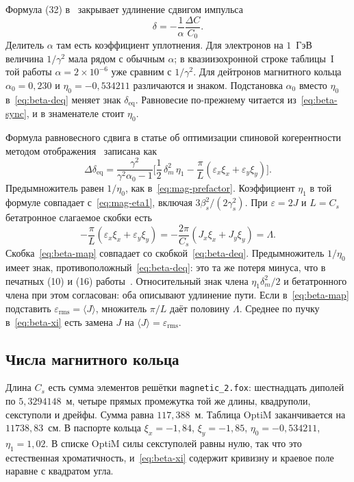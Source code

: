 \documentclass[aps,pra,preprint,a4paper,amsmath,amssymb,longbibliography]{revtex4-2}
\begin{document}
Формула (32) в~\cite{Shoji2005} закрывает удлинение сдвигом импульса
\begin{equation}
\label{eq:beta-shoji32-main}
\delta=-\frac{1}{\alpha}\frac{\Delta C}{C_0}.
\end{equation} Делитель $\alpha$ там есть коэффициент уплотнения. Для электронов на $1$~ГэВ величина $1/\gamma^2$ мала рядом с обычным $\alpha$; в квазиизохронной строке таблицы~I той работы $\alpha=2\times 10^{-6}$ уже сравним с $1/\gamma^2$. Для дейтронов магнитного кольца $\alpha_0=0{,}230$ и $\eta_0=-0{,}534211$ различаются и знаком. Подстановка $\alpha_0$ вместо $\eta_0$ в~\eqref{eq:beta-deq} меняет знак $\delta_{\mathrm{eq}}$. Равновесие по-прежнему читается из~\eqref{eq:beta-sync}, и в знаменателе стоит $\eta_0$.

Формула равновесного сдвига в статье об оптимизации спиновой когерентности методом отображения~\cite{KolokolchikovMapping} записана как
\begin{equation}
\label{eq:beta-map}
\Delta\delta_{\mathrm{eq}}
=\frac{\gamma^2}{\gamma^2\alpha_0-1}
\Biggl[
\frac{1}{2}\,\delta_m^2\,\eta_1
-\frac{\pi}{L}(\varepsilon_x\xi_x+\varepsilon_y\xi_y)
\Biggr].
\end{equation}
Предымножитель равен $1/\eta_0$, как в~\eqref{eq:mag-prefactor}. Коэффициент $\eta_1$ в той формуле совпадает с~\eqref{eq:mag-eta1}, включая $3\beta_s^2/(2\gamma_s^2)$. При $\varepsilon=2J$ и $L=C_s$ бетатронное слагаемое скобки есть
\begin{equation}
\label{eq:beta-map-L}
-\frac{\pi}{L}(\varepsilon_x\xi_x+\varepsilon_y\xi_y)
=-\frac{2\pi}{C_s}(J_x\xi_x+J_y\xi_y)
=\Lambda.
\end{equation}
Скобка~\eqref{eq:beta-map} совпадает со скобкой~\eqref{eq:beta-deq}. Предымножитель $1/\eta_0$ имеет знак, противоположный~\eqref{eq:beta-deq}: это та же потеря минуса, что в печатных (10) и (16) работы~\cite{Senichev2013}. Относительный знак члена $\eta_1\delta_m^2/2$ и бетатронного члена при этом согласован: оба описывают удлинение пути. Если в~\eqref{eq:beta-map} подставить $\varepsilon_{\mathrm{rms}}=\langle J\rangle$, множитель $\pi/L$ даёт половину $\Lambda$. Среднее по пучку в~\eqref{eq:beta-xi} есть замена $J$ на $\langle J\rangle=\varepsilon_{\mathrm{rms}}$.

\subsection{Числа магнитного кольца}
\label{sec:ch2-num}

Длина $C_s$ есть сумма элементов решётки \texttt{magnetic\_2.fox}: шестнадцать диполей по $5{,}3294148$~м, четыре прямых промежутка той же длины, квадруполи, секступоли и дрейфы. Сумма равна $117{,}388$~м. Таблица OptiM заканчивается на $11738{,}83$~см. В паспорте кольца $\xi_x=-1{,}84$, $\xi_y=-1{,}85$, $\eta_0=-0{,}534211$, $\eta_1=1{,}02$. В списке OptiM силы секступолей равны нулю, так что это естественная хроматичность, и~\eqref{eq:beta-xi} содержит кривизну и краевое поле наравне с квадратом угла.
\end{document}
